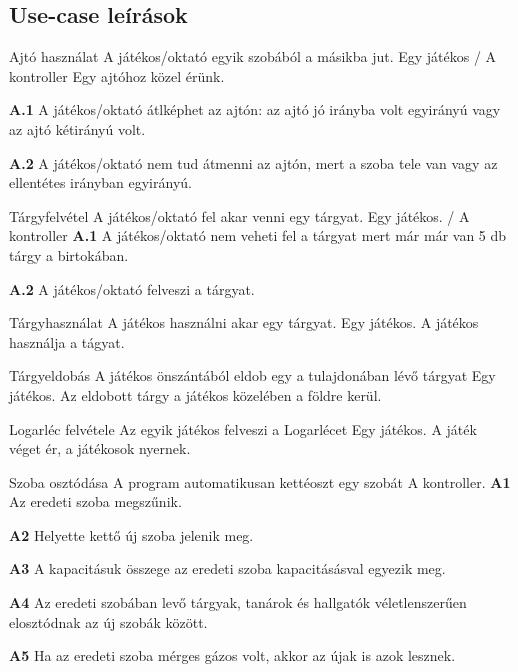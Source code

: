 \subsection{Use-case leírások}
\begin{use-case}
	{Ajtó használat}
	{A játékos/oktató egyik szobából a másikba jut.}
	{Egy játékos / A kontroller}
        Egy ajtóhoz közel érünk.
        
        \textbf{A.1} A játékos/oktató átlképhet az ajtón: az ajtó jó irányba volt egyirányú vagy az ajtó kétirányú volt. 
        
        \textbf{A.2} A játékos/oktató nem tud átmenni az ajtón, mert a szoba tele van vagy az ellentétes irányban egyirányú.
\end{use-case}
\begin{use-case}
	{Tárgyfelvétel}
	{A játékos/oktató fel akar venni egy tárgyat.}
	{Egy játékos. / A kontroller}
        \textbf{A.1} A játékos/oktató nem veheti fel a tárgyat mert már már van 5 db tárgy a birtokában.
        
        \textbf{A.2} A játékos/oktató felveszi a tárgyat.
\end{use-case}
\begin{use-case}
	{Tárgyhasználat}
	{A játékos használni akar egy tárgyat.}
	{Egy játékos.}
    {A játékos használja a tágyat.}
\end{use-case}
\begin{use-case}
	{Tárgyeldobás}
	{A játékos önszántából eldob egy a tulajdonában lévő tárgyat}
	{Egy játékos.}
    {Az eldobott tárgy a játékos közelében a földre kerül.}
\end{use-case}
\begin{use-case}
	{Logarléc felvétele}
	{Az egyik játékos felveszi a Logarlécet}
	{Egy játékos.}
    {A játék véget ér, a játékosok nyernek.}
\end{use-case}
\begin{use-case}
	{Szoba osztódása}
	{A program automatikusan kettéoszt egy szobát}
	{A kontroller.}
    \textbf{A1} Az eredeti szoba megszűnik.
    
    \textbf{A2} Helyette kettő új szoba jelenik meg.
    
    \textbf{A3} A kapacitásuk összege az eredeti szoba kapacitásásval egyezik meg.
    
    \textbf{A4} Az eredeti szobában levő tárgyak, tanárok és hallgatók véletlenszerűen elosztódnak az új szobák között.
    
    \textbf{A5} Ha az eredeti szoba mérges gázos volt, akkor az újak is azok lesznek. 
\end{use-case}

